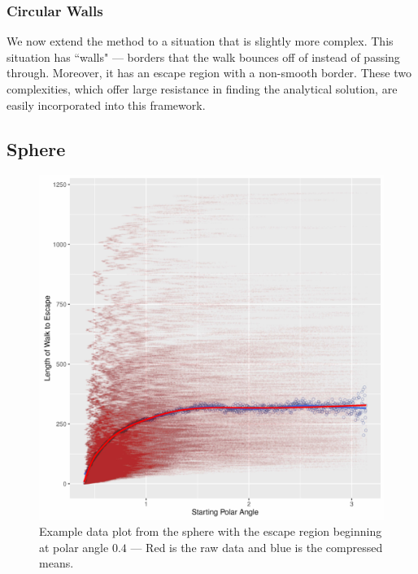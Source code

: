 \documentclass{article}
\begin{document}
		\subsubsection{Circular Walls}
			We now extend the method to a situation that is slightly more complex.
			This situation has ``walls" --- borders that the walk bounces off of instead of passing through.
			Moreover, it has an escape region with a non-smooth border.
			These two complexities, which offer large resistance in finding the analytical solution, are easily incorporated into this framework.
	\subsection{Sphere}
		\begin{figure}[h]
			\centering
			\includegraphics{images/ExampleSphereL04.pdf}
			\caption{Example data plot from the sphere with the escape region beginning at polar angle $0.4$ --- Red is the raw data and blue is the compressed means.}
		\end{figure}
		
\end{document}
